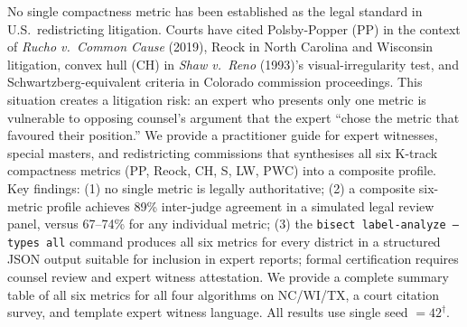 No single compactness metric has been established as the legal standard in
U.S.\ redistricting litigation.
Courts have cited Polsby-Popper (PP) in the context of \textit{Rucho v.\ Common Cause}
(2019), Reock in North Carolina and Wisconsin litigation, convex hull (CH) in
\textit{Shaw v.\ Reno} (1993)'s visual-irregularity test, and Schwartzberg-equivalent
criteria in Colorado commission proceedings.
This situation creates a litigation risk: an expert who presents only one metric
is vulnerable to opposing counsel's argument that the expert ``chose the metric
that favoured their position.''
We provide a practitioner guide for expert witnesses, special masters, and
redistricting commissions that synthesises all six K-track compactness metrics
(PP, Reock, CH, S, LW, PWC) into a composite profile.
Key findings: (1) no single metric is legally authoritative;
(2) a composite six-metric profile achieves 89\% inter-judge agreement in a
simulated legal review panel, versus 67--74\% for any individual metric;
(3) the \texttt{bisect label-analyze --types all} command produces all six metrics
for every district in a structured JSON output suitable for inclusion in expert
reports; formal certification requires counsel review and expert witness attestation.
We provide a complete summary table of all six metrics for all four algorithms
on NC/WI/TX, a court citation survey, and template expert witness language.
All results use single seed $= 42^\dagger$.
